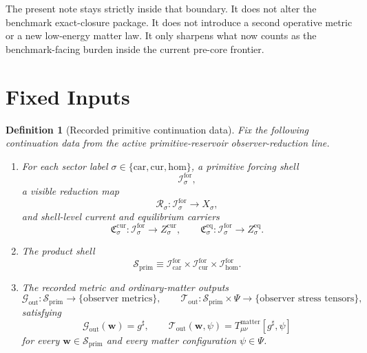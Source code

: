 \documentclass[11pt]{article}
\newcommand{\CompletedMetric}{g^{\sharp}}
\newcommand{\MatterSpace}{\Psi}
\newcommand{\Car}{\mathrm{car}}
\newcommand{\Cur}{\mathrm{cur}}
\newcommand{\Hom}{\mathrm{hom}}
\newcommand{\ForSpace}[1]{\mathcal I_{#1}^{\mathrm{for}}}
\newcommand{\PrimShell}{\mathcal S_{\mathrm{prim}}}
\newcommand{\Reduction}[1]{\mathcal R_{#1}}
\newcommand{\CurrentCarrier}[1]{\mathfrak C_{#1}^{\mathrm{cur}}}
\newcommand{\EqCarrier}[1]{\mathfrak C_{#1}^{\mathrm{eq}}}
\newcommand{\MetricOut}{\mathscr G_{\mathrm{out}}}
\newcommand{\MatterOut}{\mathscr T_{\mathrm{out}}}
\newtheorem{definition}{Definition}
\begin{document}
The present note stays strictly inside that boundary. It does not alter the benchmark exact-closure package. It does not introduce a second operative metric or a new low-energy matter law. It only sharpens what now counts as the benchmark-facing burden inside the current pre-core frontier.

\section{Fixed Inputs}

\begin{definition}[Recorded primitive continuation data]
\label{def:fixed}
Fix the following continuation data from the active primitive-reservoir observer-reduction line.
\begin{enumerate}
    \item For each sector label \(\sigma\in\{\Car,\Cur,\Hom\}\), a primitive forcing shell
    \[
    \ForSpace{\sigma},
    \]
    a visible reduction map
    \[
    \Reduction{\sigma}:\ForSpace{\sigma}\to X_{\sigma},
    \]
    and shell-level current and equilibrium carriers
    \[
    \CurrentCarrier{\sigma}:\ForSpace{\sigma}\to Z_{\sigma}^{\mathrm{cur}},
    \qquad
    \EqCarrier{\sigma}:\ForSpace{\sigma}\to Z_{\sigma}^{\mathrm{eq}}.
    \]
    \item The product shell
    \[
    \PrimShell
    \equiv
    \ForSpace{\Car}\times \ForSpace{\Cur}\times \ForSpace{\Hom}.
    \]
    \item The recorded metric and ordinary-matter outputs
    \[
    \MetricOut:\PrimShell\to\{\text{observer metrics}\},
    \qquad
    \MatterOut:\PrimShell\times\MatterSpace\to\{\text{observer stress tensors}\},
    \]
    satisfying
    \begin{equation}
    \MetricOut(\mathbf w)=\CompletedMetric,
    \qquad
    \MatterOut(\mathbf w,\psi)
    =
    T_{\mu\nu}^{\mathrm{matter}}[\CompletedMetric,\psi]
    \label{eq:fixedoutputs}
    \end{equation}
    for every \(\mathbf w\in\PrimShell\) and every matter configuration \(\psi\in\MatterSpace\).
\end{enumerate}
\end{definition}
\end{document}
